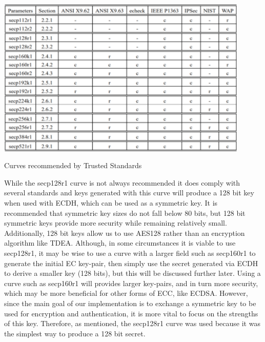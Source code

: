  \begin{table}[t]
	\centering
	\includegraphics[width=12cm,height=0.7\textheight,keepaspectratio]{./figures/table_3}
	\center\caption[font=footnote]{Curves recommended by Trusted Standards}
\end{table}

While the secp128r1 curve is not always recommended it does comply with several standards and keys generated with this curve will produce a 128 bit key when used with ECDH, which can be used as a symmetric key. It is recommended that symmetric key sizes do not fall below 80 bits, but 128 bit symmetric keys provide more security while remaining relatively small. Additionally, 128 bit keys allow us to use AES128 rather than an encryption algorithm like TDEA. Although, in some circumstances it is viable to use secp128r1, it may be wise to use a curve with a larger field such as secp160r1 to generate the initial EC key-pair, then simply use the secret generated via ECDH to derive a smaller key (128 bits), but this will be discussed further later. Using a curve such as secp160r1 will provides larger key-pairs, and in turn more security, which may be more beneficial for other forms of ECC, like ECDSA. However, since the main goal of our implementation is to exchange a symmetric key to be used for encryption and authentication, it is more vital to focus on the strengths of this key. Therefore, as mentioned, the secp128r1 curve was used because it was the simplest way to produce a 128 bit secret. 

